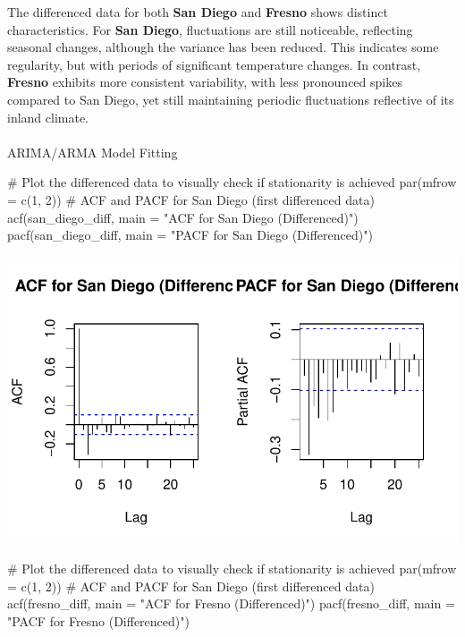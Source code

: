 \documentclass[
  11pt,
]{article}
\makeatletter
\let\oldparagraph\paragraph
\renewcommand{\paragraph}{
    \@ifstar
      \xxxParagraphStar
      \xxxParagraphNoStar
  }
\newcommand{\xxxParagraphStar}[1]{\oldparagraph*{#1}\mbox{}}
\newcommand{\xxxParagraphNoStar}[1]{\oldparagraph{#1}\mbox{}}
\newenvironment{Shaded}{\begin{snugshade}}{\end{snugshade}}
\newcommand{\AttributeTok}[1]{\textcolor[rgb]{0.40,0.45,0.13}{#1}}
\newcommand{\CommentTok}[1]{\textcolor[rgb]{0.37,0.37,0.37}{#1}}
\newcommand{\DecValTok}[1]{\textcolor[rgb]{0.68,0.00,0.00}{#1}}
\newcommand{\FunctionTok}[1]{\textcolor[rgb]{0.28,0.35,0.67}{#1}}
\newcommand{\NormalTok}[1]{\textcolor[rgb]{0.00,0.23,0.31}{#1}}
\newcommand{\StringTok}[1]{\textcolor[rgb]{0.13,0.47,0.30}{#1}}
\makeatother
\begin{document}
The differenced data for both \textbf{San Diego} and \textbf{Fresno}
shows distinct characteristics. For \textbf{San Diego}, fluctuations are
still noticeable, reflecting seasonal changes, although the variance has
been reduced. This indicates some regularity, but with periods of
significant temperature changes. In contrast, \textbf{Fresno} exhibits
more consistent variability, with less pronounced spikes compared to San
Diego, yet still maintaining periodic fluctuations reflective of its
inland climate.

\paragraph{ARIMA/ARMA Model Fitting}\label{arimaarma-model-fitting}

\begin{Shaded}
\begin{Highlighting}[]
\CommentTok{\# Plot the differenced data to visually check if stationarity is achieved}
\FunctionTok{par}\NormalTok{(}\AttributeTok{mfrow =} \FunctionTok{c}\NormalTok{(}\DecValTok{1}\NormalTok{, }\DecValTok{2}\NormalTok{)) }
\CommentTok{\# ACF and PACF for San Diego (first differenced data)}
\FunctionTok{acf}\NormalTok{(san\_diego\_diff, }\AttributeTok{main =} \StringTok{"ACF for San Diego (Differenced)"}\NormalTok{)}
\FunctionTok{pacf}\NormalTok{(san\_diego\_diff, }\AttributeTok{main =} \StringTok{"PACF for San Diego (Differenced)"}\NormalTok{)}
\end{Highlighting}
\end{Shaded}

\includegraphics{project_files/figure-pdf/unnamed-chunk-86-1.pdf}

\begin{Shaded}
\begin{Highlighting}[]
\CommentTok{\# Plot the differenced data to visually check if stationarity is achieved}
\FunctionTok{par}\NormalTok{(}\AttributeTok{mfrow =} \FunctionTok{c}\NormalTok{(}\DecValTok{1}\NormalTok{, }\DecValTok{2}\NormalTok{)) }
\CommentTok{\# ACF and PACF for San Diego (first differenced data)}
\FunctionTok{acf}\NormalTok{(fresno\_diff, }\AttributeTok{main =} \StringTok{"ACF for Fresno (Differenced)"}\NormalTok{)}
\FunctionTok{pacf}\NormalTok{(fresno\_diff, }\AttributeTok{main =} \StringTok{"PACF for Fresno (Differenced)"}\NormalTok{)}
\end{Highlighting}
\end{Shaded}
\end{document}
